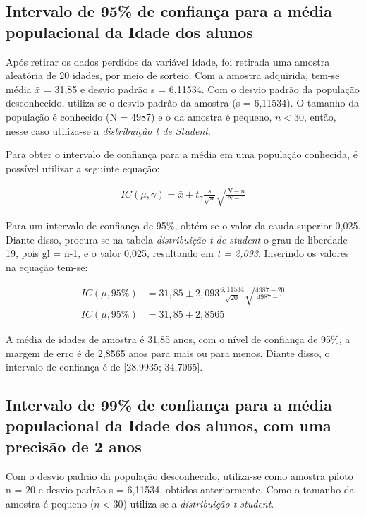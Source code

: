 \subsection{Intervalo de 95\% de confiança para a média populacional da Idade dos alunos}
\label{sub:1a}
	
	Após retirar os dados perdidos da variável Idade, foi retirada uma
	amostra aleatória de 20 idades, por meio de sorteio. Com a amostra
	adquirida, tem-se média $\bar{x}$ = 31,85 e desvio padrão s = 6,11534.
	Com o desvio padrão da população desconhecido, utiliza-se o desvio
	padrão da amostra (s = 6,11534).  O tamanho da população é conhecido (N
	= 4987) e o da amostra é pequeno, $n < 30$, então, nesse caso utiliza-se
	a \textit{distribuição t de Student}.

	Para obter o intervalo de confiança para a média em uma população
	conhecida, é possível utilizar a seguinte equação:

	\begin{align*}
		IC (\mu, \gamma) = \bar{x} \pm t_\gamma \frac{s}{\sqrt{n}} \sqrt{\frac{N-n}{N-1}}
	\end{align*}

	Para um intervalo de confiança de 95\%, obtém-se o valor da cauda
	superior 0,025. Diante disso, procura-se na tabela \textit{distribuição
	t de student} o grau de liberdade 19, pois gl = n-1, e o valor 0,025,
	resultando em \textit{t = 2,093}. Inserindo os valores na equação
	tem-se:

	\begin{align*}
		IC (\mu, 95\%) &= 31,85 \pm 2,093 \frac{6,11534}{\sqrt{20}} \sqrt{\frac{4987 - 20}{4987 - 1}} \\
		IC (\mu, 95\%) &= 31,85 \pm 2,8565
	\end{align*}

	A média de idades de amostra é 31,85 anos, com o nível de confiança de
	95\%, a margem de erro é de 2,8565 anos para mais ou para menos. Diante
	disso, o intervalo de confiança é de [28,9935; 34,7065].

\subsection{Intervalo de 99\% de confiança para a média populacional da Idade dos alunos, com uma precisão de 2 anos}

	Com o desvio padrão da população desconhecido, utiliza-se como amostra
	piloto n = 20 e desvio padrão s = 6,11534, obtidos anteriormente. Como o
	tamanho da amostra é pequeno ($n < 30$) utiliza-se a
	\textit{distribuição t student}.

